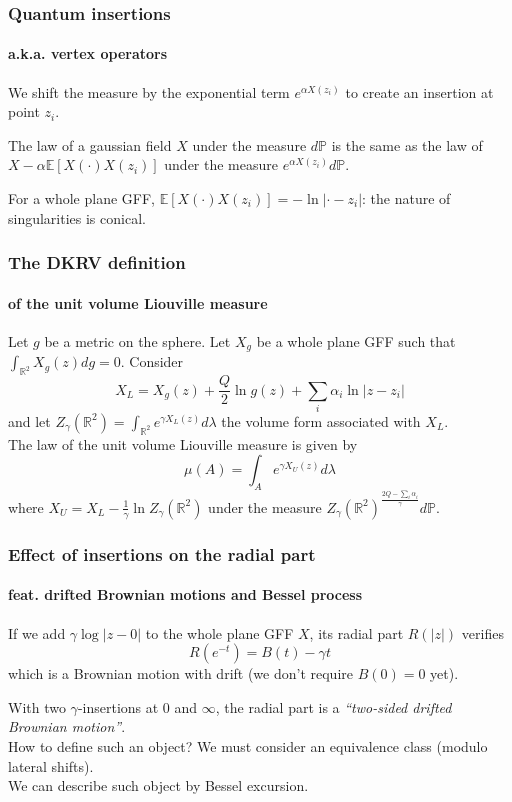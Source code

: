 \documentclass[aspectratio=169]{beamer}
\begin{document}
\begin{frame}
\frametitle{Quantum insertions}
\framesubtitle{a.k.a. vertex operators}
We shift the measure by the exponential term $e^{\alpha X(z_i)}$ to create an insertion at point $z_i$.
\begin{theorem}
The law of a gaussian field $X$ under the measure $d\mathbb{P}$ is the same as the law of $X-\alpha\mathbb{E}[X(\cdot)X(z_i)]$ under the measure $e^{\alpha X(z_i)}d\mathbb{P}$.
\end{theorem}
For a whole plane GFF, $\mathbb{E}[X(\cdot)X(z_i)]=-\ln|\cdot-z_i|$: the nature of singularities is conical.
\end{frame}

\begin{frame}
\frametitle{The DKRV definition}
\framesubtitle{of the unit volume Liouville measure}
\begin{definition}
Let $g$ be a metric on the sphere. Let $X_g$ be a whole plane GFF such that $\int_{\mathbb{R}^2}X_g(z)dg=0$.
Consider
$$X_L=X_g(z)+\frac{Q}{2}\ln g(z)+\sum_i\alpha_i\ln|z-z_i|$$
and let $Z_\gamma(\mathbb{R}^2)=\int_{\mathbb{R}^2}e^{\gamma X_L(z)}d\lambda$ the volume form associated with $X_L$.\\
The law of the unit volume Liouville measure is given by
$$\mu(A)=\int_{A}e^{\gamma X_U(z)}d\lambda$$
where $X_U=X_L-\frac{1}{\gamma}\ln Z_\gamma(\mathbb{R}^2)$ under the measure $Z_\gamma(\mathbb{R}^2)^{\frac{2Q-\sum_i\alpha_i}{\gamma}}d\mathbb{P}$.
\end{definition}
\end{frame}

\begin{frame}
\frametitle{Effect of insertions on the radial part}
\framesubtitle{feat. drifted Brownian motions and Bessel process}
\begin{lemma}
If we add $\gamma\log|z-0|$ to the whole plane GFF $X$, its radial part $R(|z|)$ verifies
$$R(e^{-t})=B(t)-\gamma t$$
which is a Brownian motion with drift (we don't require $B(0)=0$ yet).
\end{lemma}
With two $\gamma$-insertions at $0$ and $\infty$, the radial part is a \emph{``two-sided drifted Brownian motion''}.\\
How to define such an object? We must consider an equivalence class (modulo lateral shifts).\\
We can describe such object by Bessel excursion.
\end{frame}
\end{document}
